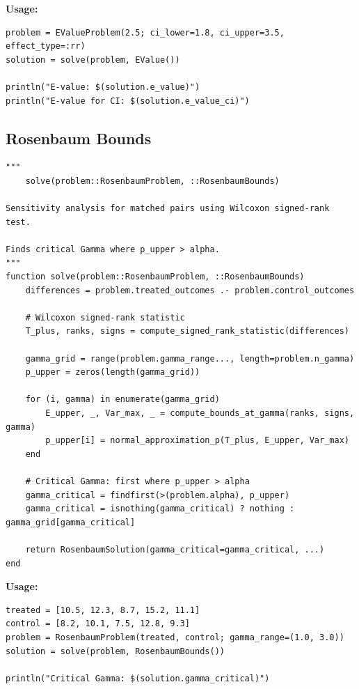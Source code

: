 \textbf{Usage:}
\begin{verbatim}
problem = EValueProblem(2.5; ci_lower=1.8, ci_upper=3.5, effect_type=:rr)
solution = solve(problem, EValue())

println("E-value: $(solution.e_value)")
println("E-value for CI: $(solution.e_value_ci)")
\end{verbatim}

\subsection{Rosenbaum Bounds}

\begin{verbatim}
"""
    solve(problem::RosenbaumProblem, ::RosenbaumBounds)

Sensitivity analysis for matched pairs using Wilcoxon signed-rank test.

Finds critical Gamma where p_upper > alpha.
"""
function solve(problem::RosenbaumProblem, ::RosenbaumBounds)
    differences = problem.treated_outcomes .- problem.control_outcomes

    # Wilcoxon signed-rank statistic
    T_plus, ranks, signs = compute_signed_rank_statistic(differences)

    gamma_grid = range(problem.gamma_range..., length=problem.n_gamma)
    p_upper = zeros(length(gamma_grid))

    for (i, gamma) in enumerate(gamma_grid)
        E_upper, _, Var_max, _ = compute_bounds_at_gamma(ranks, signs, gamma)
        p_upper[i] = normal_approximation_p(T_plus, E_upper, Var_max)
    end

    # Critical Gamma: first where p_upper > alpha
    gamma_critical = findfirst(>(problem.alpha), p_upper)
    gamma_critical = isnothing(gamma_critical) ? nothing : gamma_grid[gamma_critical]

    return RosenbaumSolution(gamma_critical=gamma_critical, ...)
end
\end{verbatim}

\textbf{Usage:}
\begin{verbatim}
treated = [10.5, 12.3, 8.7, 15.2, 11.1]
control = [8.2, 10.1, 7.5, 12.8, 9.3]
problem = RosenbaumProblem(treated, control; gamma_range=(1.0, 3.0))
solution = solve(problem, RosenbaumBounds())

println("Critical Gamma: $(solution.gamma_critical)")
\end{verbatim}

